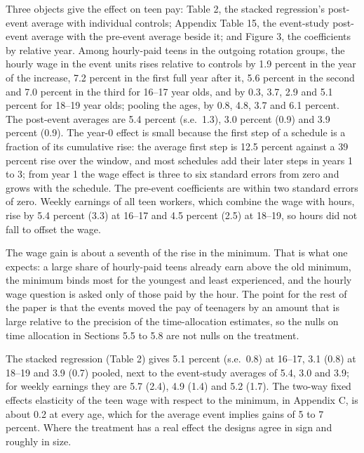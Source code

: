 \documentclass[12pt]{article}
\begin{document}
Three objects give the effect on teen pay: Table 2, the stacked regression's post-event average with individual controls; Appendix Table 15, the event-study post-event average with the pre-event average beside it; and Figure 3, the coefficients by relative year. Among hourly-paid teens in the outgoing rotation groups, the hourly wage in the event units rises relative to controls by 1.9 percent in the year of the increase, 7.2 percent in the first full year after it, 5.6 percent in the second and 7.0 percent in the third for 16--17 year olds, and by 0.3, 3.7, 2.9 and 5.1 percent for 18--19 year olds; pooling the ages, by 0.8, 4.8, 3.7 and 6.1 percent. The post-event averages are 5.4 percent (s.e.\ 1.3), 3.0 percent (0.9) and 3.9 percent (0.9). The year-0 effect is small because the first step of a schedule is a fraction of its cumulative rise: the average first step is 12.5 percent against a 39 percent rise over the window, and most schedules add their later steps in years 1 to 3; from year 1 the wage effect is three to six standard errors from zero and grows with the schedule. The pre-event coefficients are within two standard errors of zero. Weekly earnings of all teen workers, which combine the wage with hours, rise by 5.4 percent (3.3) at 16--17 and 4.5 percent (2.5) at 18--19, so hours did not fall to offset the wage.

The wage gain is about a seventh of the rise in the minimum. That is what one expects: a large share of hourly-paid teens already earn above the old minimum, the minimum binds most for the youngest and least experienced, and the hourly wage question is asked only of those paid by the hour. The point for the rest of the paper is that the events moved the pay of teenagers by an amount that is large relative to the precision of the time-allocation estimates, so the nulls on time allocation in Sections 5.5 to 5.8 are not nulls on the treatment.


The stacked regression (Table 2) gives 5.1 percent (s.e.\ 0.8) at 16--17, 3.1 (0.8) at 18--19 and 3.9 (0.7) pooled, next to the event-study averages of 5.4, 3.0 and 3.9; for weekly earnings they are 5.7 (2.4), 4.9 (1.4) and 5.2 (1.7). The two-way fixed effects elasticity of the teen wage with respect to the minimum, in Appendix C, is about 0.2 at every age, which for the average event implies gains of 5 to 7 percent. Where the treatment has a real effect the designs agree in sign and roughly in size.
\end{document}
